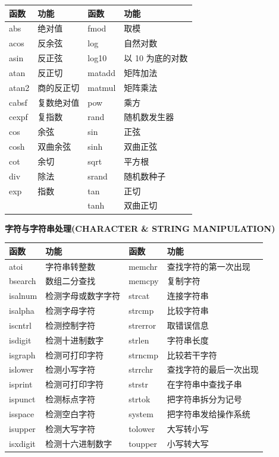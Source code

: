 {\def\LTcaptype{none} %
\begin{longtable}[]{@{}llll@{}}
\toprule\noalign{}
函数 & 功能 & 函数 & 功能 \\
\midrule\noalign{}
\endhead
\bottomrule\noalign{}
\endlastfoot
abs & 绝对值 & fmod & 取模 \\
acos & 反余弦 & log & 自然对数 \\
asin & 反正弦 & log10 & 以 10 为底的对数 \\
atan & 反正切 & matadd & 矩阵加法 \\
atan2 & 商的反正切 & matmul & 矩阵乘法 \\
cabsf & 复数绝对值 & pow & 乘方 \\
cexpf & 复指数 & rand & 随机数发生器 \\
cos & 余弦 & sin & 正弦 \\
cosh & 双曲余弦 & sinh & 双曲正弦 \\
cot & 余切 & sqrt & 平方根 \\
div & 除法 & srand & 随机数种子 \\
exp & 指数 & tan & 正切 \\
& & tanh & 双曲正切 \\
\end{longtable}
}

\textbf{字符与字符串处理(CHARACTER \& STRING MANIPULATION)}

{\def\LTcaptype{none} %
\begin{longtable}[]{@{}llll@{}}
\toprule\noalign{}
函数 & 功能 & 函数 & 功能 \\
\midrule\noalign{}
\endhead
\bottomrule\noalign{}
\endlastfoot
atoi & 字符串转整数 & memchr & 查找字符的第一次出现 \\
bsearch & 数组二分查找 & memcpy & 复制字符 \\
isalnum & 检测字母或数字字符 & strcat & 连接字符串 \\
isalpha & 检测字母字符 & strcmp & 比较字符串 \\
iscntrl & 检测控制字符 & strerror & 取错误信息 \\
isdigit & 检测十进制数字 & strlen & 字符串长度 \\
isgraph & 检测可打印字符 & strncmp & 比较若干字符 \\
islower & 检测小写字符 & strrchr & 查找字符的最后一次出现 \\
isprint & 检测可打印字符 & strstr & 在字符串中查找子串 \\
ispunct & 检测标点字符 & strtok & 把字符串拆分为记号 \\
isspace & 检测空白字符 & system & 把字符串发给操作系统 \\
isupper & 检测大写字符 & tolower & 大写转小写 \\
isxdigit & 检测十六进制数字 & toupper & 小写转大写 \\
\end{longtable}
}

